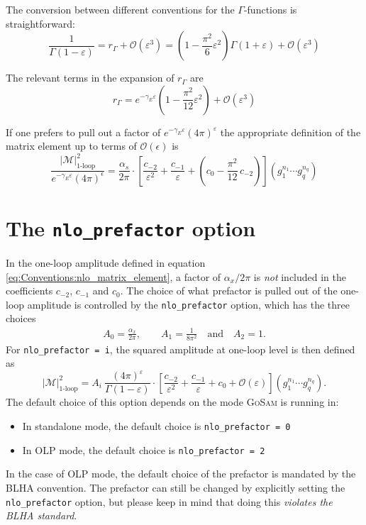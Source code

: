 \documentclass[11pt,a4paper]{refrep}
\newcommand{\gosam}{\textsc{GoSam}\xspace}
\begin{document}
The conversion between different conventions for the $\Gamma$-functions
is straightforward:
\begin{equation}
\frac{1}{\Gamma(1-\varepsilon)}=r_\Gamma+{\mathcal O}(\varepsilon^3)=
\left(1-\frac{\pi^2}{6}\varepsilon^2\right)\Gamma(1+\varepsilon)
   +{\mathcal O}(\varepsilon^3)
\end{equation}

The relevant terms in the expansion of $r_\Gamma$ are
\begin{equation}
r_\Gamma=e^{-\gamma_E\varepsilon}
\left(1-\frac{\pi^2}{12}\varepsilon^2\right)+\mathcal{O}(\varepsilon^3)
\end{equation}

If one prefers to pull out a factor of
$e^{-\gamma_E\varepsilon}(4\pi)^{\varepsilon}$ the appropriate
definition of the matrix element up to terms of $\mathcal{O}(\epsilon)$ is
\begin{equation}
\frac{\left\vert\mathcal{M}\right\vert^2_{\text{1-loop}}}%
{e^{-\gamma_E\varepsilon}(4\pi)^\epsilon}=
\frac{\alpha_s}{2\pi}
\cdot\left[\frac{c_{-2}}{\varepsilon^2}+\frac{c_{-1}}{\varepsilon}
+\left(c_0-\frac{\pi^2}{12}\,c_{-2}\right)
\right](g_1^{n_1}\cdots g_q^{n_q})
\end{equation}

\section{The \texttt{nlo\_prefactor} option}
\label{sec:nlo_prefactors}
In the one-loop amplitude defined in equation \eqref{eq:Conventions:nlo_matrix_element}, a factor of $\alpha_x/2\pi$ is \emph{not} included in the coefficients $c_{-2}$, $c_{-1}$ and $c_0$. The choice of what prefactor is pulled out of the one-loop amplitude is controlled by the \texttt{nlo\_prefactor} option, which has the three choices
\begin{eqnarray}
   A_0 = \frac{\alpha_x}{2\pi}, \qquad A_1 = \frac{1}{8 \pi^2} \quad \text{and} \quad A_2 = 1.
\end{eqnarray}
For \texttt{nlo\_prefactor = i}, the squared amplitude at one-loop level is then defined as
\begin{equation}
   \left|\mathcal{M}\right|^2_{\text{1-loop}}=
A_i\ \frac{(4\pi)^\varepsilon}{\Gamma(1-\varepsilon)}
\cdot\left[\frac{c_{-2}}{\varepsilon^2}+\frac{c_{-1}}{\varepsilon}+c_0
+{\mathcal{O}}(\varepsilon)\right](g_1^{n_1}\cdots g_q^{n_q}).
\end{equation}
The default choice of this option depends on the mode \gosam is running in:
\begin{itemize}
   \item In standalone mode, the default choice is \texttt{nlo\_prefactor = 0}
   \item In OLP mode, the default choice is \texttt{nlo\_prefactor = 2}
\end{itemize}
In the case of OLP mode, the default choice of the prefactor is mandated by the BLHA convention. The prefactor can still be changed by explicitly setting the \texttt{nlo\_prefactor} option, but please keep in mind that doing this \emph{violates the BLHA standard}.
\end{document}
